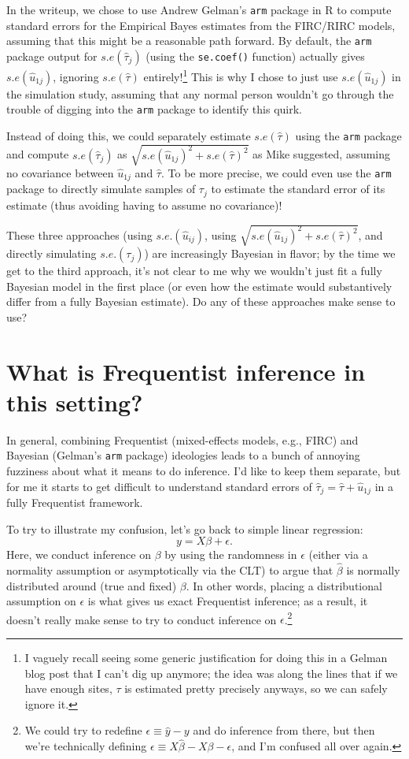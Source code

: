 \documentclass[]{article}
\begin{document}
In the writeup, we chose to use Andrew Gelman's \texttt{arm} package in R to compute standard errors for the Empirical Bayes estimates from the FIRC/RIRC models, assuming that this might be a reasonable path forward.
By default, the \texttt{arm} package output for $s.e(\hat{\tau}_j)$ (using the \texttt{se.coef()} function) actually gives $s.e(\hat{u}_{1j})$, ignoring $s.e(\hat{\tau})$ entirely!\footnote{I vaguely recall seeing some generic justification for doing this in a Gelman blog post that I can't dig up anymore; the idea was along the lines that if we have enough sites, $\tau$ is estimated pretty precisely anyways, so we can safely ignore it.}
This is why I chose to just use $s.e(\hat{u}_{1j})$ in the simulation study, assuming that any normal person wouldn't go through the trouble of digging into the \texttt{arm} package to identify this quirk.

Instead of doing this, we could separately estimate $s.e(\hat{\tau})$ using the \texttt{arm} package and compute $s.e(\hat{\tau}_j)$ as $\sqrt{s.e(\hat{u}_{1j})^2 + s.e(\hat{\tau})^2}$ as Mike suggested, assuming no covariance between $\hat{u}_{1j}$ and $\hat{\tau}$.
To be more precise, we could even use the \texttt{arm} package to directly simulate samples of $\tau_j$ to estimate the standard error of its estimate (thus avoiding having to assume no covariance)!

These three approaches (using $s.e.(\hat{u}_{ij})$, using $\sqrt{s.e(\hat{u}_{1j})^2 + s.e(\hat{\tau})^2}$, and directly simulating $s.e.(\tau_j)$) are increasingly Bayesian in flavor; by the time we get to the third approach, it's not clear to me why we wouldn't just fit a fully Bayesian model in the first place (or even how the estimate would substantively differ from a fully Bayesian estimate).
Do any of these approaches make sense to use?


\section{What is Frequentist inference in this setting?}

In general, combining Frequentist (mixed-effects models, e.g., FIRC) and Bayesian (Gelman's \texttt{arm} package) ideologies leads to a bunch of annoying fuzziness about what it means to do inference.
I'd like to keep them separate, but for me it starts to get difficult to understand standard errors of $\hat{\tau}_j = \hat{\tau} + \hat{u}_{1j}$ in a fully Frequentist framework.

To try to illustrate my confusion, let's go back to simple linear regression:
$$y = X \beta + \epsilon.$$
Here, we conduct inference on $\beta$ by using the randomness in $\epsilon$ (either via a normality assumption or asymptotically via the CLT) to argue that $\hat{\beta}$ is normally distributed around (true and fixed) $\beta$.
In other words, placing a distributional assumption on $\epsilon$ is what gives us exact Frequentist inference; as a result, it doesn't really make sense to try to conduct inference on $\epsilon$.\footnote{We could try to redefine $\epsilon \equiv \hat{y} - y$ and do inference from there, but then we're technically defining $\epsilon \equiv X \hat{\beta} - X \beta - \epsilon$, and I'm confused all over again.}
\end{document}
